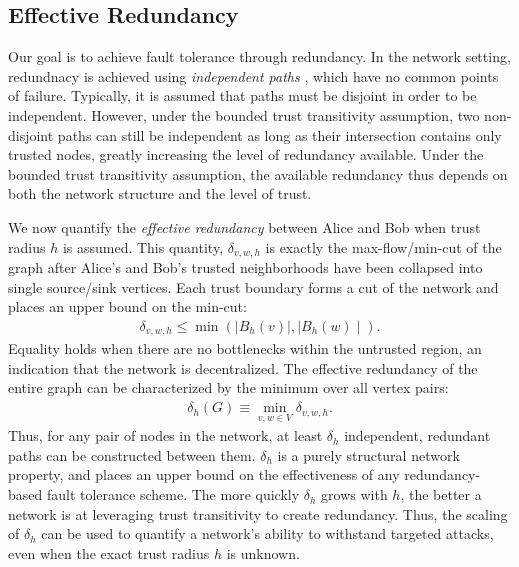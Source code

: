 \documentclass[sigconf]{acmart}
\newcommand{\beq}{\begin{eqnarray}}
\newcommand{\eeq}{\end{eqnarray}}
\begin{document}
\subsection{Effective Redundancy}

Our goal is to achieve fault tolerance through redundancy.
In the network setting, redundnacy is achieved using
{\em independent paths} \cite{reiter_resilient_1998},
which have no common points of failure.
Typically, it is assumed that paths must be disjoint in order to be
independent.
However, under the bounded trust transitivity assumption, two non-disjoint paths
can still be independent as long as their intersection contains only trusted
nodes,
greatly increasing the level of redundancy available.
Under the bounded trust transitivity assumption, the available redundancy thus depends on
both the network structure and the level of trust.

We now quantify the {\em effective redundancy} between Alice and Bob
when trust radius $h$ is assumed.
This quantity, $\delta_{v,w,h}$ is exactly the max-flow/min-cut of
the graph after Alice's and Bob's trusted neighborhoods have been
collapsed into single source/sink vertices.
Each trust boundary forms a cut of the network and places an upper bound on the
min-cut:
\beq
\delta_{v,w,h} \leq \min\left( \mid B_h(v) \mid, \mid B_h(w) \mid \right).
\eeq
Equality holds when there are no bottlenecks within the untrusted region,
an indication that the network is decentralized.
The effective redundancy of the entire graph can be characterized by the minimum over
all vertex pairs:
\beq
\delta_h(G) \equiv \min_{v,w \in V} \delta_{v,w,h}.
\eeq
Thus, for any pair of nodes in the network, at least $\delta_h$ independent,
redundant paths can be constructed between them.
$\delta_h$ is a purely structural network property,
and places an upper bound on the effectiveness of any
redundancy-based fault tolerance scheme.
The more quickly $\delta_h$ grows with $h$,
the better a network is at leveraging trust transitivity to create redundancy.
Thus, the scaling of $\delta_h$ can be used to quantify a network's ability
to withstand targeted attacks,
even when the exact trust radius $h$ is unknown.
\end{document}
